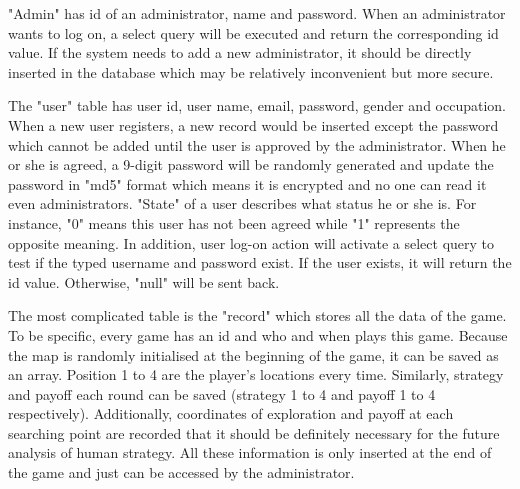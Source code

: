  "Admin" has id of an administrator, name and password. When an administrator wants to log on, a select query will be executed and return the corresponding id value. If the system needs to add a new administrator, it should be directly inserted in the database which may be relatively inconvenient but more secure. 
 
The "user" table has user id, user name, email, password, gender and occupation. When a new user registers, a new record would be inserted except the password which cannot be added until the user is approved by the administrator. When he or she is agreed, a 9-digit password will be randomly generated and update the password in "md5" format which means it is encrypted and no one can read it even administrators. "State" of a user describes what status he or she is. For instance, "0" means this user has not been agreed while "1" represents the opposite meaning. In addition, user log-on action will activate a select query to test if the typed username and password exist. If the user exists, it will return the id value. Otherwise, "null" will be sent back.

The most complicated table is the "record" which stores all the data of the game. To be specific, every game has an id and who and when plays this game. Because the map is randomly initialised at the beginning of the game, it can be saved as an array. Position 1 to 4 are the player's locations every time. Similarly, strategy and payoff each round can be saved (strategy 1 to 4 and payoff 1 to 4 respectively). Additionally, coordinates of exploration and payoff at each searching point are recorded that it should be definitely necessary for the future analysis of human strategy. All these information is only inserted at the end of the game and just can be accessed by the administrator.






